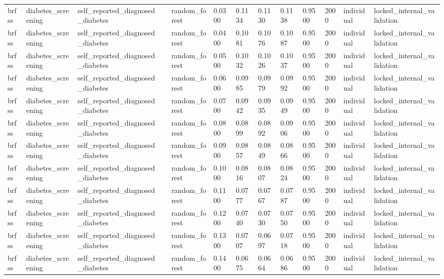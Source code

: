 \begin{tabular}{lllllllllllll}
brfss & diabetes\_screening & self\_reported\_diagnosed\_diabetes &  & random\_forest & 0.0300 & 0.1134 & 0.1130 & 0.1138 & 0.9500 & 2000 & individual & locked\_internal\_validation \\
brfss & diabetes\_screening & self\_reported\_diagnosed\_diabetes &  & random\_forest & 0.0400 & 0.1081 & 0.1076 & 0.1087 & 0.9500 & 2000 & individual & locked\_internal\_validation \\
brfss & diabetes\_screening & self\_reported\_diagnosed\_diabetes &  & random\_forest & 0.0500 & 0.1032 & 0.1026 & 0.1037 & 0.9500 & 2000 & individual & locked\_internal\_validation \\
brfss & diabetes\_screening & self\_reported\_diagnosed\_diabetes &  & random\_forest & 0.0600 & 0.0985 & 0.0979 & 0.0992 & 0.9500 & 2000 & individual & locked\_internal\_validation \\
brfss & diabetes\_screening & self\_reported\_diagnosed\_diabetes &  & random\_forest & 0.0700 & 0.0942 & 0.0935 & 0.0949 & 0.9500 & 2000 & individual & locked\_internal\_validation \\
brfss & diabetes\_screening & self\_reported\_diagnosed\_diabetes &  & random\_forest & 0.0800 & 0.0899 & 0.0892 & 0.0906 & 0.9500 & 2000 & individual & locked\_internal\_validation \\
brfss & diabetes\_screening & self\_reported\_diagnosed\_diabetes &  & random\_forest & 0.0900 & 0.0857 & 0.0849 & 0.0866 & 0.9500 & 2000 & individual & locked\_internal\_validation \\
brfss & diabetes\_screening & self\_reported\_diagnosed\_diabetes &  & random\_forest & 0.1000 & 0.0816 & 0.0807 & 0.0824 & 0.9500 & 2000 & individual & locked\_internal\_validation \\
brfss & diabetes\_screening & self\_reported\_diagnosed\_diabetes &  & random\_forest & 0.1100 & 0.0777 & 0.0767 & 0.0787 & 0.9500 & 2000 & individual & locked\_internal\_validation \\
brfss & diabetes\_screening & self\_reported\_diagnosed\_diabetes &  & random\_forest & 0.1200 & 0.0740 & 0.0730 & 0.0750 & 0.9500 & 2000 & individual & locked\_internal\_validation \\
brfss & diabetes\_screening & self\_reported\_diagnosed\_diabetes &  & random\_forest & 0.1300 & 0.0707 & 0.0697 & 0.0718 & 0.9500 & 2000 & individual & locked\_internal\_validation \\
brfss & diabetes\_screening & self\_reported\_diagnosed\_diabetes &  & random\_forest & 0.1400 & 0.0675 & 0.0664 & 0.0686 & 0.9500 & 2000 & individual & locked\_internal\_validation \\

\end{tabular}
